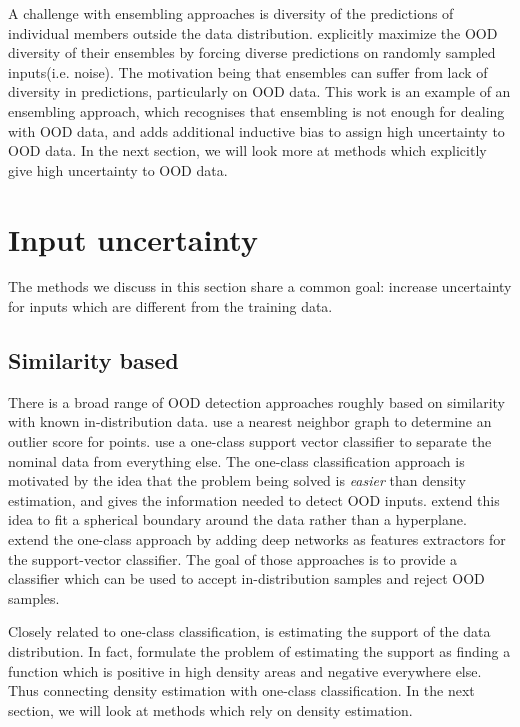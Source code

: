 \documentclass[../main.tex]{subfiles}
\begin{document}
A challenge with ensembling approaches is diversity of the predictions of individual members outside the data distribution. \citet{jain2019maximizing} explicitly maximize the OOD diversity of their ensembles by forcing diverse predictions on randomly sampled inputs(i.e. noise). The motivation being that ensembles can suffer from lack of diversity in predictions, particularly on OOD data. This work is an example of an ensembling approach, which recognises that ensembling is not enough for dealing with OOD data, and adds additional inductive bias to assign high uncertainty to OOD data. 
In the next section, we will look more at methods which explicitly give high uncertainty to OOD data. 


\section{Input uncertainty}
The methods we discuss in this section share a common goal: increase uncertainty for inputs which are different from the training data. 

\subsection{Similarity based}


There is a broad range of OOD detection approaches roughly based on similarity with known in-distribution data. \citep{hautamaki2004outlier, NIPS2009_3723, zhang2009new} use a nearest neighbor graph to determine an outlier score for points. 
\cite{scholkopf2000support} use a one-class support vector classifier to separate the nominal data from everything else. The one-class classification approach is motivated by the idea that the problem being solved is \emph{easier} than density estimation, and gives the information needed to detect OOD inputs.  
\citet{tax2004support} extend this idea to fit a spherical boundary around the data rather than a hyperplane. \citet{erfani2016high, ruff2018deep} extend the one-class approach by adding deep networks as features extractors for the support-vector classifier. The goal of those approaches is to provide a classifier which can be used to accept in-distribution samples and reject OOD samples. 

Closely related to one-class classification, is estimating the support of the data distribution. In fact, \citet{platt1999estimating} formulate the problem of estimating the support as finding a function which is positive in high density areas and negative everywhere else. Thus connecting density estimation with one-class classification. In the next section, we will look at methods which rely on density estimation. 
\end{document}

